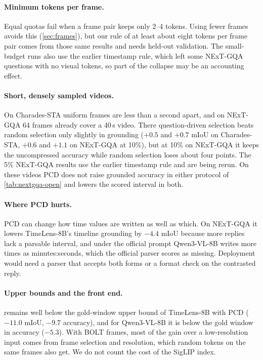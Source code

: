 \paragraph{Minimum tokens per frame.}
Equal quotas fail when a frame pair keeps only 2--4 tokens. Using fewer frames avoids this (\cref{sec:frames}), but
our rule of at least about eight tokens per frame pair comes from those same results and needs held-out validation.
The small-budget runs also use the earlier timestamp rule, which left some NExT-GQA questions with no visual tokens,
so part of the collapse may be an accounting effect. 

\paragraph{Short, densely sampled videos.}
On Charades-STA uniform frames are less than a second apart, and on NExT-GQA 64 frames already cover a 40\,s video.
There question-driven selection beats random selection only slightly in grounding ($+0.5$ and $+0.7$ mIoU on
Charades-STA, $+0.6$ and $+1.1$ on NExT-GQA at 10\%), but at 10\% on NExT-GQA it keeps the uncompressed accuracy
while random selection loses about four points. The 5\% NExT-GQA results use the earlier timestamp rule and are
being rerun. On these videos PCD does not raise grounded accuracy in either protocol of \cref{tab:nextgqa-open} and
lowers the scored interval in both.

\paragraph{Where PCD hurts.}
PCD can change how time values are written as well as which. On NExT-GQA it lowers TimeLens-8B's timeline grounding
by $-4.4$ mIoU because more replies lack a parsable interval, and under the official prompt Qwen3-VL-8B writes more
times as minutes:seconds, which the official parser scores as missing. Deployment would need a parser that accepts
both forms or a format check on the contrasted reply.

\paragraph{Upper bounds and the front end.}
\method remains well below the gold-window upper bound of TimeLens-8B with PCD ($-11.0$ mIoU, $-9.7$ accuracy), and
for Qwen3-VL-8B it is below the gold window in accuracy ($-5.3$). With BOLT frames, most of the gain over a
low-resolution input comes from frame selection and resolution, which random tokens on the same frames also get. We
do not count the cost of the SigLIP index.


